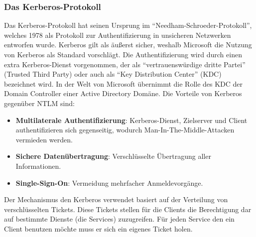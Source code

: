         \subsubsection{Das Kerberos-Protokoll}
          Das Kerberos-Protokoll hat seinen Ursprung im
          \enquote{Needham-Schroeder-Protokoll}, welches 1978 als Protokoll zur
          Authentifizierung in unsicheren Netzwerken entworfen wurde. Kerberos
          gilt als äußerst sicher, weshalb Microsoft die Nutzung von Kerberos
          als Standard vorschlägt. Die Authentifizierung wird durch einen extra
          Kerberos-Dienst vorgenommen, der als \enquote{vertrauenswürdige dritte
          Partei} (Trusted Third Party) oder auch als \enquote{Key Distribution
          Center} (KDC) bezeichnet wird. In der Welt von Microsoft übernimmt die
          Rolle des KDC der Domain Controller einer Active Directory Domäne. Die
          Vorteile von Kerberos gegenüber NTLM sind:
          \begin{itemize}
            \item \textbf{Multilaterale Authentifizierung}: Kerberos-Dienst,
            Zielserver und Client authentifizieren sich gegenseitig, wodurch
            Man-In-The-Middle-Attacken vermieden werden.
            \item \textbf{Sichere Datenübertragung}: Verschlüsselte
            Übertragung aller Informationen.
            \item \textbf{Single-Sign-On}: Vermeidung mehrfacher
            Anmeldevorgänge.
          \end{itemize}
           Der Mechanismus den Kerberos verwendet basiert auf der Verteilung von
           verschlüsselten Tickets. Diese Tickets stellen für die Clients die
           Berechtigung dar auf bestimmte Dienste (die Services) zuzugreifen.
           Für jeden Service den ein Client benutzen möchte muss er sich ein eigenes
           Ticket holen.
           
